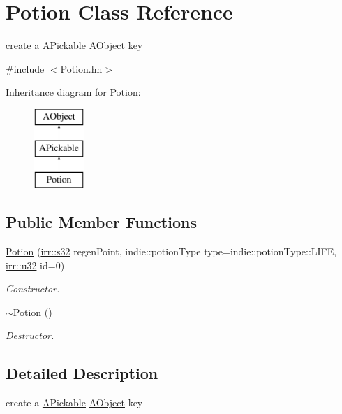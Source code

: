 \hypertarget{classPotion}{}\section{Potion Class Reference}
\label{classPotion}


create a \hyperlink{classAPickable}{A\+Pickable} \hyperlink{classAObject}{A\+Object} key  




{\ttfamily \#include $<$Potion.\+hh$>$}

Inheritance diagram for Potion\+:\begin{figure}[H]
\begin{center}
\leavevmode
\includegraphics[height=3.000000cm]{classPotion}
\end{center}
\end{figure}
\subsection*{Public Member Functions}
\begin{DoxyCompactItemize}
\item 
\hyperlink{classPotion_a2fae017a2dbe6fd82269d19a51908959}{Potion} (\hyperlink{namespaceirr_ac66849b7a6ed16e30ebede579f9b47c6}{irr\+::s32} regen\+Point, indie\+::potion\+Type type=indie\+::potion\+Type\+::\+L\+I\+FE, \hyperlink{namespaceirr_a0416a53257075833e7002efd0a18e804}{irr\+::u32} id=0)
\begin{DoxyCompactList}\small\item\em Constructor. \end{DoxyCompactList}\item 
\hyperlink{classPotion_a8730c8052ec698171885bb5dacda9cca}{$\sim$\+Potion} ()
\begin{DoxyCompactList}\small\item\em Destructor. \end{DoxyCompactList}\end{DoxyCompactItemize}


\subsection{Detailed Description}
create a \hyperlink{classAPickable}{A\+Pickable} \hyperlink{classAObject}{A\+Object} key 

